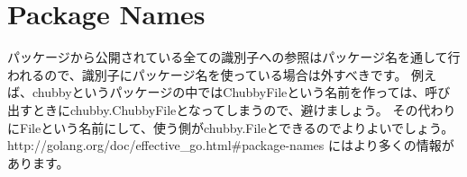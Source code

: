 \section{Package Names}

パッケージから公開されている全ての識別子への参照はパッケージ名を通して行われるので、識別子にパッケージ名を使っている場合は外すべきです。 例えば、chubbyというパッケージの中ではChubbyFileという名前を作っては、呼び出すときにchubby.ChubbyFileとなってしまうので、避けましょう。 その代わりにFileという名前にして、使う側がchubby.Fileとできるのでよりよいでしょう。 http:\//\//golang.org\//doc\//effective\_go.html\#package-names にはより多くの情報があります。
